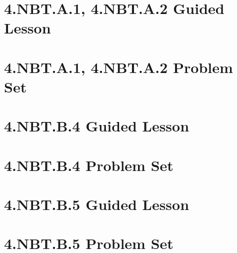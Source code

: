 \documentclass[a4paper,12pt]{article}
\title{}
\date{}
\begin{document}

\hypertarget{toc}{}  %
\tableofcontents
\newpage

\pagestyle{fancy}  %

\newpage
\section{4.NBT.A.1, 4.NBT.A.2 Guided Lesson}


\newpage
\section{4.NBT.A.1, 4.NBT.A.2 Problem Set}


\newpage
\section{4.NBT.B.4 Guided Lesson}


\newpage
\section{4.NBT.B.4 Problem Set}


\newpage
\section{4.NBT.B.5 Guided Lesson}


\newpage
\section{4.NBT.B.5 Problem Set}

\end{document}
